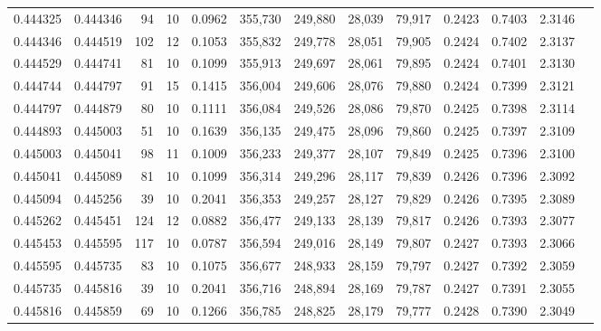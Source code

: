\begin{tabular}{rrrrrrrrrrrrr}
0.444325 & 0.444346 &    94 &  10 &                                     0.0962 & 355,730 & 249,880 &  28,039 &  79,917 & 0.2423 & 0.7403 & 2.3146 \\
0.444346 & 0.444519 &   102 &  12 &                                     0.1053 & 355,832 & 249,778 &  28,051 &  79,905 & 0.2424 & 0.7402 & 2.3137 \\
0.444529 & 0.444741 &    81 &  10 &                                     0.1099 & 355,913 & 249,697 &  28,061 &  79,895 & 0.2424 & 0.7401 & 2.3130 \\
0.444744 & 0.444797 &    91 &  15 &                                     0.1415 & 356,004 & 249,606 &  28,076 &  79,880 & 0.2424 & 0.7399 & 2.3121 \\
0.444797 & 0.444879 &    80 &  10 &                                     0.1111 & 356,084 & 249,526 &  28,086 &  79,870 & 0.2425 & 0.7398 & 2.3114 \\
0.444893 & 0.445003 &    51 &  10 &                                     0.1639 & 356,135 & 249,475 &  28,096 &  79,860 & 0.2425 & 0.7397 & 2.3109 \\
0.445003 & 0.445041 &    98 &  11 &                                     0.1009 & 356,233 & 249,377 &  28,107 &  79,849 & 0.2425 & 0.7396 & 2.3100 \\
0.445041 & 0.445089 &    81 &  10 &                                     0.1099 & 356,314 & 249,296 &  28,117 &  79,839 & 0.2426 & 0.7396 & 2.3092 \\
0.445094 & 0.445256 &    39 &  10 &                                     0.2041 & 356,353 & 249,257 &  28,127 &  79,829 & 0.2426 & 0.7395 & 2.3089 \\
0.445262 & 0.445451 &   124 &  12 &                                     0.0882 & 356,477 & 249,133 &  28,139 &  79,817 & 0.2426 & 0.7393 & 2.3077 \\
0.445453 & 0.445595 &   117 &  10 &                                     0.0787 & 356,594 & 249,016 &  28,149 &  79,807 & 0.2427 & 0.7393 & 2.3066 \\
0.445595 & 0.445735 &    83 &  10 &                                     0.1075 & 356,677 & 248,933 &  28,159 &  79,797 & 0.2427 & 0.7392 & 2.3059 \\
0.445735 & 0.445816 &    39 &  10 &                                     0.2041 & 356,716 & 248,894 &  28,169 &  79,787 & 0.2427 & 0.7391 & 2.3055 \\
0.445816 & 0.445859 &    69 &  10 &                                     0.1266 & 356,785 & 248,825 &  28,179 &  79,777 & 0.2428 & 0.7390 & 2.3049 \\

\end{tabular}
